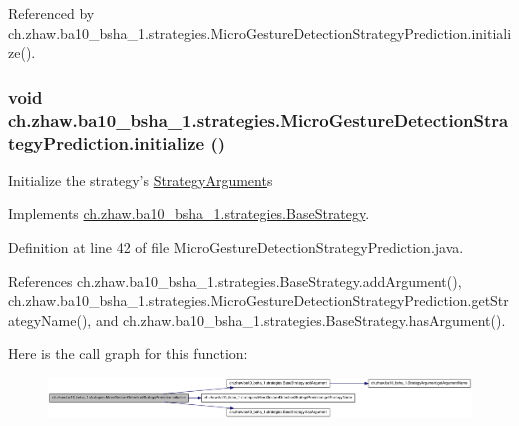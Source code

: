 Referenced by ch.zhaw.ba10\_\-bsha\_\-1.strategies.MicroGestureDetectionStrategyPrediction.initialize().\hypertarget{classch_1_1zhaw_1_1ba10__bsha__1_1_1strategies_1_1MicroGestureDetectionStrategyPrediction_ae0261f02e4d7596c9fff8322c78fa012}{
\subsubsection[{initialize}]{\setlength{\rightskip}{0pt plus 5cm}void ch.zhaw.ba10\_\-bsha\_\-1.strategies.MicroGestureDetectionStrategyPrediction.initialize ()}}
\label{classch_1_1zhaw_1_1ba10__bsha__1_1_1strategies_1_1MicroGestureDetectionStrategyPrediction_ae0261f02e4d7596c9fff8322c78fa012}
Initialize the strategy's \hyperlink{classch_1_1zhaw_1_1ba10__bsha__1_1_1StrategyArgument}{StrategyArgument}s 

Implements \hyperlink{classch_1_1zhaw_1_1ba10__bsha__1_1_1strategies_1_1BaseStrategy_af6ea27835befac71906915236a347450}{ch.zhaw.ba10\_\-bsha\_\-1.strategies.BaseStrategy}.

Definition at line 42 of file MicroGestureDetectionStrategyPrediction.java.

References ch.zhaw.ba10\_\-bsha\_\-1.strategies.BaseStrategy.addArgument(), ch.zhaw.ba10\_\-bsha\_\-1.strategies.MicroGestureDetectionStrategyPrediction.getStrategyName(), and ch.zhaw.ba10\_\-bsha\_\-1.strategies.BaseStrategy.hasArgument().

Here is the call graph for this function:\nopagebreak
\begin{figure}[H]
\begin{center}
\leavevmode
\includegraphics[width=420pt]{classch_1_1zhaw_1_1ba10__bsha__1_1_1strategies_1_1MicroGestureDetectionStrategyPrediction_ae0261f02e4d7596c9fff8322c78fa012_cgraph}
\end{center}
\end{figure}


